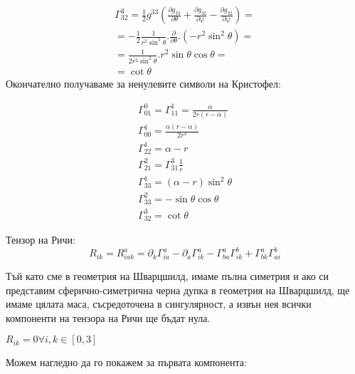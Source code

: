 \documentclass[a4paper,12pt]{article}
\begin{document}
    \begin{equation}
        \begin{aligned}
        \varGamma^3_{32} = \frac{1}{2}g^{33}\left(\frac{\partial g_{33}}{\partial \theta} + \frac{\partial g_{32}}{\partial \varphi} - \frac{\partial g_{32}}{\partial \varphi}\right) =\\
        = -\frac{1}{2}\frac{1}{r^2\sin^2\theta}.\frac{\partial}{\partial \theta}.(-r^2\sin^2\theta) = \\
        = \frac{1}{2r^2\sin^2\theta}.r^2\sin\theta\cos\theta = \\
        = \cot\theta
        \end{aligned}
    \end{equation}
    \newline
    Окончателно получаваме за ненулевите символи на Кристофел:


    \begin{equation*}
        \begin{aligned}
        \varGamma^0_{01} = \varGamma^1_{11} = \frac{\alpha}{2r(r-\alpha)} \\ 
        \varGamma^1_{00} = \frac{\alpha(r-\alpha)}{2r^3} \\ 
        \varGamma^1_{22} = \alpha - r \\
        \varGamma^2_{21} = \varGamma^3_{31}\frac{1}{r} \\
        \varGamma^1_{33} = (\alpha - r)\sin^2\theta \\
        \varGamma^2_{33} = - \sin\theta\cos\theta \\
        \varGamma^3_{32} = \cot\theta
    \end{aligned}
    \end{equation*}

    Тензор на Ричи:
    \begin{equation*}
        R_{ik} = R^a_{iak} = \partial_k\varGamma^a_{ia} - \partial_a\varGamma^a_{ik}-\varGamma^a_{ba}\varGamma^b_{ik} + \varGamma^a_{bk}\varGamma^b_{ai}
    \end{equation*}

    Тъй като сме в геометрия на Шварцшилд, имаме пълна симетрия и ако си представим
    сферично-симетрична черна дупка в геометрия на Шварцшилд, ще имаме 
    цялата маса, съсредоточена в сингулярност, а извън нея всички компоненти на тензора на 
    Ричи ще бъдат нула.

    $R_{ik}=0 \forall i, k \in [0, 3]$

    Можем нагледно да го покажем за първата компонента:
\end{document}
